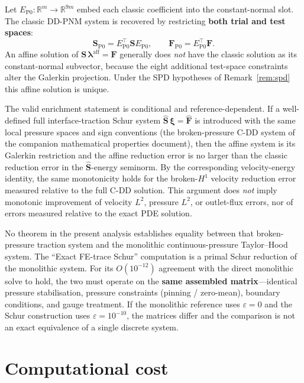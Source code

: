 \documentclass[11pt,a4paper]{article}
\newcommand{\R}{\mathbb{R}}
\newcommand{\trac}{\bm{\lambda}}
\newcommand{\Schur}{\mathbf{S}}
\begin{document}
Let $E_{\text{P0}} : \R^m \to \R^{9m}$ embed each classic coefficient
into the constant-normal slot.  The classic DD-PNM system is recovered
by restricting \textbf{both trial and test spaces}:
\[
  \Schur_{\text{P0}} = E_{\text{P0}}^\top \Schur E_{\text{P0}},\qquad
  \bm{F}_{\text{P0}} = E_{\text{P0}}^\top \bm{F}.
\]
An affine solution of
$\Schur\,\trac^{\mathrm{aff}} = \bm{F}$
generally does \emph{not} have the classic solution as its
constant-normal subvector, because the eight additional test-space
constraints alter the Galerkin projection.  Under the SPD hypotheses
of Remark~\ref{rem:spd} this affine solution is unique.

The valid enrichment statement is conditional and reference-dependent.
If a well-defined full interface-traction Schur system
$\widehat{\Schur}\,\bm{\xi} = \widehat{\bm{F}}$ is introduced with the
same local pressure spaces and sign conventions (the broken-pressure
C-DD system of the companion mathematical properties document), then
the affine system is its Galerkin restriction and the affine reduction
error is no larger than the classic reduction error in the
$\widehat{\Schur}$-energy seminorm.  By the corresponding
velocity-energy identity, the same monotonicity holds for the
broken-$H^1$ velocity reduction error measured relative to the full
C-DD solution.  This argument does \emph{not} imply monotonic
improvement of velocity $L^2$, pressure $L^2$, or outlet-flux errors,
nor of errors measured relative to the exact PDE solution.

No theorem in the present analysis establishes equality between that
broken-pressure traction system and the monolithic continuous-pressure
Taylor--Hood system.  The ``Exact FE-trace Schur'' computation is a
primal Schur reduction of the monolithic system.  For its $O(10^{-12})$
agreement with the direct monolithic solve to hold, the two must operate
on the \textbf{same assembled matrix}---identical pressure stabilisation,
pressure constraints (pinning / zero-mean), boundary conditions, and
gauge treatment.  If the monolithic reference uses $\varepsilon=0$ and
the Schur construction uses $\varepsilon=10^{-10}$, the matrices differ
and the comparison is not an exact equivalence of a single discrete
system.

\section{Computational cost}
\end{document}
